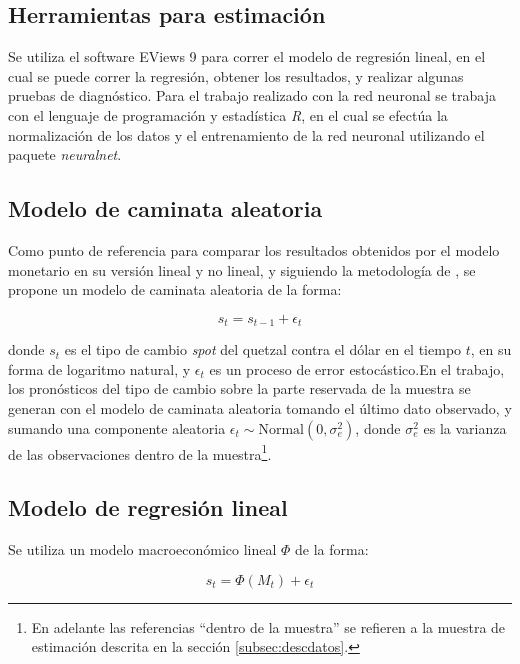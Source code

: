 \subsection{Herramientas para estimación}

Se utiliza el software EViews 9 para correr el modelo de regresión lineal, en el cual se puede correr la regresión, obtener los resultados, y realizar algunas pruebas de diagnóstico. Para el trabajo realizado con la red neuronal se trabaja con el lenguaje de programación y estadística \textit{R}, en el cual se efectúa la normalización de los datos y el entrenamiento de la red neuronal utilizando el paquete \textit{neuralnet}.

\subsection{Modelo de caminata aleatoria}
Como punto de referencia para comparar los resultados obtenidos por el modelo monetario en su versión lineal y no lineal, y siguiendo la metodología de \textcite{meese1983empirical}, se propone un modelo de caminata aleatoria de la forma: 

\begin{equation}
	s_t = s_{t-1} + \epsilon_t
\end{equation}

donde $s_t$ es el tipo de cambio \textit{spot} del quetzal contra el dólar en el tiempo $t$, en su forma de logaritmo natural, y $\epsilon_t$ es un proceso de error estocástico.En el trabajo, los pronósticos del tipo de cambio sobre la parte reservada de la muestra se generan con el modelo de caminata aleatoria tomando el último dato observado, y sumando una componente aleatoria $\epsilon_t \sim \mathrm{Normal}(0, \sigma_e^2)$, donde $\sigma_e^2$ es la varianza de las observaciones dentro de la muestra\footnote{En adelante las referencias ``dentro de la muestra'' se refieren a la muestra de estimación descrita en la sección \ref{subsec:descdatos}.}.

\subsection{Modelo de regresión lineal}
\label{subsec:modeloLineal}

Se utiliza un modelo macroeconómico lineal $\Phi$ de la forma: 

\[	s_t = \Phi (M_t) + \epsilon_t \]

